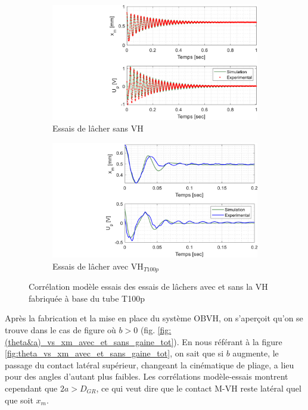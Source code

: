 \begin{figure}[!htb]
\begin{center}
	\begin{subfigure}[b]{0.49\textwidth}
    	\captionsetup{justification=centering}
		\includegraphics[trim={9cm 0cm 0cm 0cm},clip,width=\textwidth]{../Chap6/Figure/exp_lacher_free.pdf}
		\caption{Essais de lâcher sans VH}
		\label{fig:exp_lacher_free}
	\end{subfigure}
\hfillx
	\begin{subfigure}[b]{0.49\textwidth}
    	\captionsetup{justification=centering}
		\includegraphics[trim={9cm 0cm 0cm 0cm},clip,width=\textwidth]{../Chap6/Figure/exp_lacher_t100p.pdf}
		\caption{Essais de lâcher avec VH$_{T100p}$}
		\label{fig:exp_lacher_t100p}  
	\end{subfigure}
	\caption{Corrélation modèle essais des essais de lâchers avec et sans la VH fabriquée à base du tube T100p}
	\label{fig:lacher_avec et sans T100p}
\end{center}	
\end{figure} 

Après la fabrication et la mise en place du système OBVH, on s'aperçoit qu'on se trouve dans le cas de figure où $b>0$ (fig. \ref{fig:(theta&a)_vs_xm_avec_et_sans_gaine_tot}). En nous référant à la figure \ref{fig:theta_vs_xm_avec_et_sans_gaine_tot}, on sait que si $b$ augmente, le passage du contact latéral supérieur, changeant la cinématique de pliage, a lieu pour des angles d'autant plus faibles. Les corrélations modèle-essais montrent cependant que $2a>D_{GR}$, ce qui veut dire que le contact M-VH reste latéral quel que soit $x_m$. 

